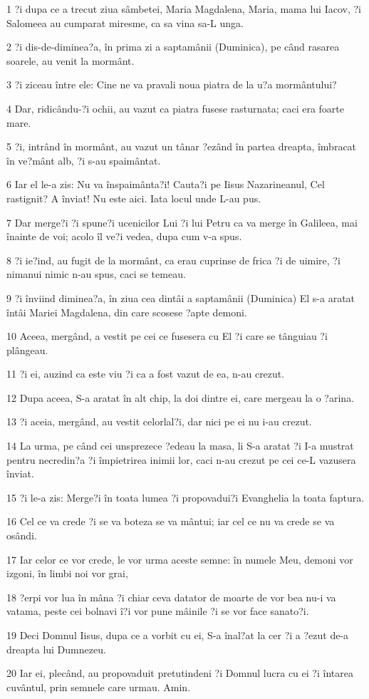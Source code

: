 \par 1 ?i dupa ce a trecut ziua sâmbetei, Maria Magdalena, Maria, mama lui Iacov, ?i Salomeea au cumparat miresme, ca sa vina sa-L unga.
\par 2 ?i dis-de-diminea?a, în prima zi a saptamânii (Duminica), pe când rasarea soarele, au venit la mormânt.
\par 3 ?i ziceau între ele: Cine ne va pravali noua piatra de la u?a mormântului?
\par 4 Dar, ridicându-?i ochii, au vazut ca piatra fusese rasturnata; caci era foarte mare.
\par 5 ?i, intrând în mormânt, au vazut un tânar ?ezând în partea dreapta, îmbracat în ve?mânt alb, ?i s-au spaimântat.
\par 6 Iar el le-a zis: Nu va înspaimânta?i! Cauta?i pe Iisus Nazarineanul, Cel rastignit? A înviat! Nu este aici. Iata locul unde L-au pus.
\par 7 Dar merge?i ?i spune?i ucenicilor Lui ?i lui Petru ca va merge în Galileea, mai înainte de voi; acolo îl ve?i vedea, dupa cum v-a spus.
\par 8 ?i ie?ind, au fugit de la mormânt, ca erau cuprinse de frica ?i de uimire, ?i nimanui nimic n-au spus, caci se temeau.
\par 9 ?i înviind diminea?a, în ziua cea dintâi a saptamânii (Duminica) El s-a aratat întâi Mariei Magdalena, din care scosese ?apte demoni.
\par 10 Aceea, mergând, a vestit pe cei ce fusesera cu El ?i care se tânguiau ?i plângeau.
\par 11 ?i ei, auzind ca este viu ?i ca a fost vazut de ea, n-au crezut.
\par 12 Dupa aceea, S-a aratat în alt chip, la doi dintre ei, care mergeau la o ?arina.
\par 13 ?i aceia, mergând, au vestit celorlal?i, dar nici pe ei nu i-au crezut.
\par 14 La urma, pe când cei unsprezece ?edeau la masa, li S-a aratat ?i I-a mustrat pentru necredin?a ?i împietrirea inimii lor, caci n-au crezut pe cei ce-L vazusera înviat.
\par 15 ?i le-a zis: Merge?i în toata lumea ?i propovadui?i Evanghelia la toata faptura.
\par 16 Cel ce va crede ?i se va boteza se va mântui; iar cel ce nu va crede se va osândi.
\par 17 Iar celor ce vor crede, le vor urma aceste semne: în numele Meu, demoni vor izgoni, în limbi noi vor grai,
\par 18 ?erpi vor lua în mâna ?i chiar ceva datator de moarte de vor bea nu-i va vatama, peste cei bolnavi î?i vor pune mâinile ?i se vor face sanato?i.
\par 19 Deci Domnul Iisus, dupa ce a vorbit cu ei, S-a înal?at la cer ?i a ?ezut de-a dreapta lui Dumnezeu.
\par 20 Iar ei, plecând, au propovaduit pretutindeni ?i Domnul lucra cu ei ?i întarea cuvântul, prin semnele care urmau. Amin.


